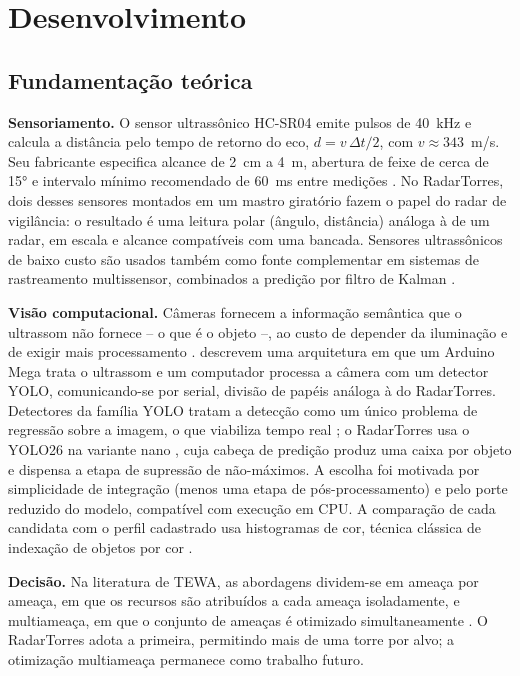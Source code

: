 \documentclass[12pt,a4paper]{article}
\begin{document}
\section{Desenvolvimento}

\subsection{Fundamentação teórica}

\textbf{Sensoriamento.} O sensor ultrassônico HC-SR04 emite pulsos de 40~kHz e calcula a
distância pelo tempo de retorno do eco, $d = v\,\Delta t/2$, com $v \approx 343$~m/s. Seu
fabricante especifica alcance de 2~cm a 4~m, abertura de feixe de cerca de 15° e intervalo
mínimo recomendado de 60~ms entre medições \cite{hcsr04}. No RadarTorres, dois desses sensores
montados em um mastro giratório fazem o papel do radar de vigilância: o resultado é uma leitura
polar (ângulo, distância) análoga à de um radar, em escala e alcance compatíveis com uma bancada.
Sensores ultrassônicos de baixo custo são usados também como fonte complementar em sistemas de
rastreamento multissensor, combinados a predição por filtro de Kalman \cite{curbscan,kalman1960}.

\textbf{Visão computacional.} Câmeras fornecem a informação semântica que o ultrassom não
fornece -- o que é o objeto --, ao custo de depender da iluminação e de exigir mais processamento
\cite{majoni2025}.  descrevem uma arquitetura em que um Arduino Mega trata o
ultrassom e um computador processa a câmera com um detector YOLO, comunicando-se por serial, divisão
de papéis análoga à do RadarTorres. Detectores da família YOLO tratam a detecção como um único
problema de regressão sobre a imagem, o que viabiliza tempo real \cite{redmon2016yolo}; o RadarTorres
usa o YOLO26 na variante nano \cite{ultralytics_yolo26}, cuja cabeça de predição produz uma caixa
por objeto e dispensa a etapa de supressão de não-máximos. A escolha foi motivada por simplicidade
de integração (menos uma etapa de pós-processamento) e pelo porte reduzido do modelo, compatível com
execução em CPU. A comparação de cada candidata com o perfil cadastrado usa histogramas de cor, técnica
clássica de indexação de objetos por cor \cite{swain1991colorindexing}.

\textbf{Decisão.} Na literatura de TEWA, as abordagens dividem-se em ameaça por ameaça, em que os
recursos são atribuídos a cada ameaça isoladamente, e multiameaça, em que o conjunto de ameaças é
otimizado simultaneamente \cite{roux2007tewa,tewa_multiameaca2009,tewa2009}. O RadarTorres adota a
primeira, permitindo mais de uma torre por alvo; a otimização multiameaça permanece como trabalho
futuro.
\end{document}
